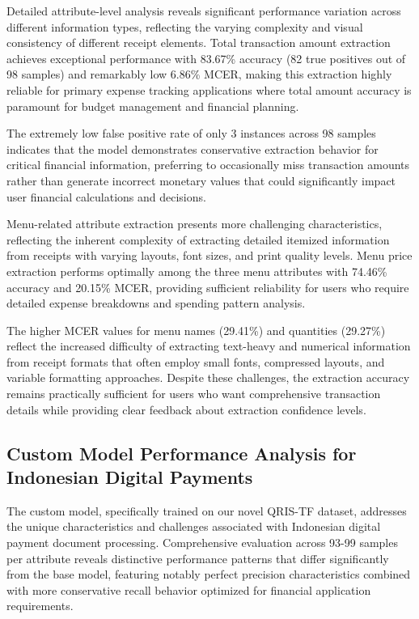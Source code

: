Detailed attribute-level analysis reveals significant performance variation across different information types, reflecting the varying complexity and visual consistency of different receipt elements. Total transaction amount extraction achieves exceptional performance with 83.67\% accuracy (82 true positives out of 98 samples) and remarkably low 6.86\% MCER, making this extraction highly reliable for primary expense tracking applications where total amount accuracy is paramount for budget management and financial planning.

The extremely low false positive rate of only 3 instances across 98 samples indicates that the model demonstrates conservative extraction behavior for critical financial information, preferring to occasionally miss transaction amounts rather than generate incorrect monetary values that could significantly impact user financial calculations and decisions.

Menu-related attribute extraction presents more challenging characteristics, reflecting the inherent complexity of extracting detailed itemized information from receipts with varying layouts, font sizes, and print quality levels. Menu price extraction performs optimally among the three menu attributes with 74.46\% accuracy and 20.15\% MCER, providing sufficient reliability for users who require detailed expense breakdowns and spending pattern analysis.

The higher MCER values for menu names (29.41\%) and quantities (29.27\%) reflect the increased difficulty of extracting text-heavy and numerical information from receipt formats that often employ small fonts, compressed layouts, and variable formatting approaches. Despite these challenges, the extraction accuracy remains practically sufficient for users who want comprehensive transaction details while providing clear feedback about extraction confidence levels.

\subsection{Custom Model Performance Analysis for Indonesian Digital Payments}
The custom model, specifically trained on our novel QRIS-TF dataset, addresses the unique characteristics and challenges associated with Indonesian digital payment document processing. Comprehensive evaluation across 93-99 samples per attribute reveals distinctive performance patterns that differ significantly from the base model, featuring notably perfect precision characteristics combined with more conservative recall behavior optimized for financial application requirements.

